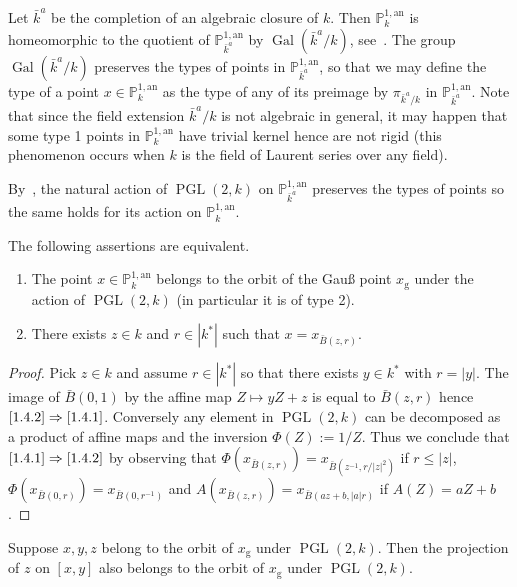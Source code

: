 \documentclass[AHL,Unicode,longabstracts]{cedram}
\DeclareMathOperator{\Gal}{Gal}
\DeclareMathOperator{\PGL}{PGL}
\newcommand{\an}{\mathrm{an}}
\newcommand{\abs}[1]{\left\vert#1\right\vert}
\newcommand{\PP}{\mathbb{P}}
\begin{document}
Let $\bar{k}^a$ be the completion of an algebraic closure of $k$. Then $\PP^{1,\an}_{k}$ is homeomorphic to the quotient of $\PP^{1,\an}_{\bar{k}^a}$ by $\Gal(\bar{k}^a/k)$, see~\cite[Cor.~1.3.6]{berko}. The group $\Gal(\bar{k}^a/k)$ preserves the types of points in $\PP^{1,\an}_{\bar{k}^a}$, so that we may define the type of a point $x \in \PP^{1,\an}_k$ as the type of any of its preimage by $\pi_{\bar{k}^a/k}$ in $\PP^{1,\an}_{\bar{k}^a}$. Note that since the field extension $\bar{k}^a/k$ is not algebraic in general, it may happen that some type 1 points in $\PP^{1,\an}_k$ have trivial kernel hence are not rigid (this phenomenon occurs when $k$ is the field of Laurent series over any field).

By~\cite[Prop.~2.15]{baker-rumely}, the natural action of $\PGL(2, k)$ on $\PP^{1,\an}_{\bar{k}^a}$ preserves the types of points so the same holds for its action on $\PP^{1,\an}_k$.

\begin{prop}\label{prop:orbit gauss}
The following assertions are equivalent.
\begin{enumerate}
\item \label{1.4.1} The point $x\in \PP^{1,\an}_k$ belongs to the orbit of the Gau{\ss} point $x_{\mathrm{g}}$ under the action of $\PGL(2,k)$ (in particular it is of type 2).
\item \label{1.4.2} There exists $z\in k$ and $r\in |k^*|$ such that $x= x_{\bar{B}(z,r)}$.
\end{enumerate}
\end{prop}

\begin{proof}
Pick $z\in k$ and assume $r\in \abs{k^*}$ so that there exists $y\in k^*$ with $r= |y|$. The image of $\bar{B}(0,1)$ by the affine map $Z \mapsto yZ + z$ is equal to $\bar{B}(z,r)$ hence $\eqref{1.4.2}\Rightarrow\eqref{1.4.1}$. Conversely any element in $\PGL(2,k)$ can be decomposed as a product of affine maps and the inversion $\Phi(Z) := 1/Z$. Thus we conclude that $\eqref{1.4.1}\Rightarrow\eqref{1.4.2}$ by observing that $\Phi(x_{\bar{B}(z,r)})= x_{\bar{B}(z^{-1},r/|z|^2)}$ if $r \le |z|$, $\Phi(x_{\bar{B}(0,r)})= x_{\bar{B}(0,r^{-1})}$ and $A(x_{\bar{B}(z,r)}) = x_{\bar{B}(az+b, |a|r)}$ if $A(Z) = aZ +b$.
\end{proof}

\begin{prop}\label{prop:projection}
Suppose $x,y, z$ belong to the orbit of $x_{\mathrm{g}}$ under $\PGL(2,k)$. Then the projection of $z$ on $[x,y]$ also belongs to the orbit of $x_{\mathrm{g}}$ under $\PGL(2,k)$.
\end{prop}
\end{document}
